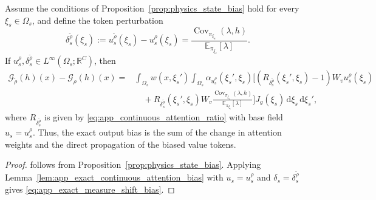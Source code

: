 \begin{theorem}
\label{thm:app_exact_measure_shift_bias}
Assume the conditions of Proposition~\ref{prop:physics_state_bias} hold for every $\xi_s\in\Omega_s$, and define the token perturbation
\begin{equation}
    \delta_s^{\widetilde{\rho}}(\xi_s)
    :=u_s^{\widetilde{\rho}}(\xi_s)-u_s^{\rho}(\xi_s)
    =\frac{\operatorname{Cov}_{\pi_{\xi_s}}(\lambda,h)}
    {\mathbb{E}_{\pi_{\xi_s}}[\lambda]}.
    \label{eq:app_measure_induced_token_shift}
\end{equation}
If $u_s^{\rho},\delta_s^{\widetilde{\rho}}\in L^{\infty}(\Omega_s;\mathbb{R}^{C})$, then
\begin{align}
    \mathcal{G}_{\widetilde{\rho}}(h)(x)-\mathcal{G}_{\rho}(h)(x)
    ={}&\int_{\Omega_s}w(x,\xi_s')
    \int_{\Omega_s}\alpha_{u_s^{\rho}}(\xi_s',\xi_s)
    \Big[(R_{\delta_s^{\widetilde{\rho}}}(\xi_s',\xi_s)-1)W_vu_s^{\rho}(\xi_s)
    \nonumber\\
    &\quad+R_{\delta_s^{\widetilde{\rho}}}(\xi_s',\xi_s)W_v
    \frac{\operatorname{Cov}_{\pi_{\xi_s}}(\lambda,h)}
    {\mathbb{E}_{\pi_{\xi_s}}[\lambda]}\Big]
    J_g(\xi_s)\,\mathrm{d}\xi_s\,\mathrm{d}\xi_s',
    \label{eq:app_exact_measure_shift_bias}
\end{align}
where $R_{\delta_s^{\widetilde{\rho}}}$ is given by \eqref{eq:app_continuous_attention_ratio} with base field $u_s=u_s^{\rho}$. Thus, the exact output bias is the sum of the change in attention weights and the direct propagation of the biased value tokens.
\end{theorem}

\begin{proof}
 follows from Proposition~\ref{prop:physics_state_bias}. Applying Lemma~\ref{lem:app_exact_continuous_attention_bias} with $u_s=u_s^{\rho}$ and $\delta_s=\delta_s^{\widetilde{\rho}}$ gives \eqref{eq:app_exact_measure_shift_bias}.
\end{proof}

